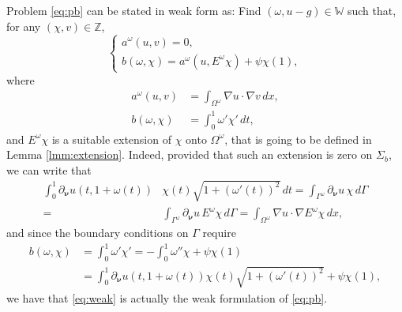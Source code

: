 \documentclass[final,hidelinks]{siamart1116Arxiv}
\numberwithin{theorem}{section}
\newcommand{\sol}{{u}}
\newcommand{\test}{{v}}
\newcommand{\gtest}{{\chi}}
\newcommand{\normal}{{\boldsymbol \nu}}
\newcommand{\angolo}{{\psi}}
\begin{document}
Problem \cref{eq:pb} can be stated in weak form as:
Find $(\omega,\sol-g)\in\mathbb{W}$ such that, for any $(\gtest,\test)\in\mathbb{Z}$,
\begin{equation}\label{eq:weak}
    \begin{cases}
	a^\omega(\sol,\test) = 0, \\
	b(\omega,\gtest) = a^\omega(\sol,E^\omega\gtest) + \angolo\gtest(1),
    \end{cases}
\end{equation}
where
\begin{align}
    a^\omega(\sol,\test) &= \int_{\Omega^\omega} \nabla\sol\cdot\nabla\test\,dx, \\
    b(\omega,\gtest) &= \int_0^1 \omega'\gtest'\, dt,
\end{align}
and $E^\omega\gtest$ is a suitable extension of $\gtest$ onto $\Omega^\omega$, that is going to be defined in Lemma \ref{lmm:extension}.
Indeed, provided that such an extension is zero on $\Sigma_b$, we can write that
\begin{align}
    \int_0^1 \partial_\normal\sol(t,1+\omega(t))&\gtest(t)\sqrt{1+(\omega'(t))^2}\,dt = \int_{\Gamma^\omega}\partial_\normal\sol\,\gtest\,d\Gamma \\= &\int_{\Gamma^\omega}\partial_\normal\sol\, E^\omega\gtest \, d\Gamma = \int_{\Omega^\omega} \nabla\sol\cdot\nabla E^\omega\gtest\,dx,
\end{align}
and since the boundary conditions on $\Gamma$ require
\begin{align}
 b(\omega,\gtest) &= \int_0^1\omega'\gtest' = -\int_0^1\omega''\gtest + \angolo\gtest(1) \\
 &= \int_0^1\partial_\normal\sol(t,1+\omega(t))\gtest(t)\sqrt{1+(\omega'(t))^2}+\angolo\gtest(1),
\end{align}
we have that \cref{eq:weak} is actually the weak formulation of \cref{eq:pb}.
\end{document}
